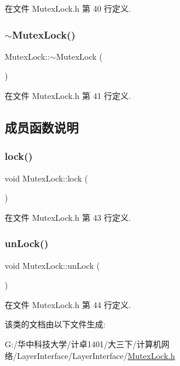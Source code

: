 在文件 Mutex\+Lock.\+h 第 40 行定义.

\mbox{\label{class_mutex_lock_ad00ab7ab87cdf453bec5a5b90f447847}} 
\subsubsection{\texorpdfstring{$\sim$\+Mutex\+Lock()}{~MutexLock()}}
{\footnotesize\ttfamily Mutex\+Lock\+::$\sim$\+Mutex\+Lock (\begin{DoxyParamCaption}{ }\end{DoxyParamCaption})\hspace{0.3cm}{\ttfamily [inline]}}



在文件 Mutex\+Lock.\+h 第 41 行定义.



\subsection{成员函数说明}
\mbox{\label{class_mutex_lock_a78d4fe5df4e15cffc2b647e7efb9a58a}} 
\subsubsection{\texorpdfstring{lock()}{lock()}}
{\footnotesize\ttfamily void Mutex\+Lock\+::lock (\begin{DoxyParamCaption}{ }\end{DoxyParamCaption})\hspace{0.3cm}{\ttfamily [inline]}}



在文件 Mutex\+Lock.\+h 第 43 行定义.

\mbox{\label{class_mutex_lock_a442ba1ef110b2f08476a56fc68725668}} 
\subsubsection{\texorpdfstring{un\+Lock()}{unLock()}}
{\footnotesize\ttfamily void Mutex\+Lock\+::un\+Lock (\begin{DoxyParamCaption}{ }\end{DoxyParamCaption})\hspace{0.3cm}{\ttfamily [inline]}}



在文件 Mutex\+Lock.\+h 第 44 行定义.



该类的文档由以下文件生成\+:\begin{DoxyCompactItemize}
\item 
G\+:/华中科技大学/计卓1401/大三下/计算机网络/\+Layer\+Interface/\+Layer\+Interface/\hyperlink{_mutex_lock_8h}{Mutex\+Lock.\+h}\end{DoxyCompactItemize}
